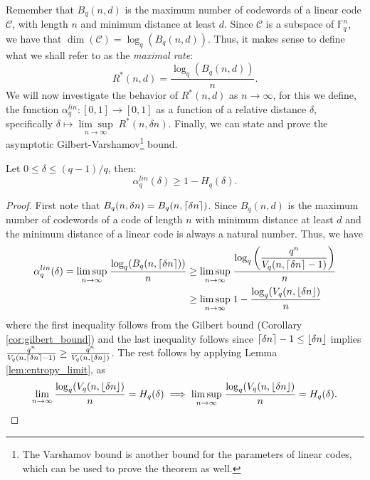 \newpage
Remember that $B_q(n, d)$ is the maximum number of codewords of a linear code $\mathcal{C}$, with length $n$ and minimum distance at least $d$. Since $\mathcal{C}$ is a subspace of $\mathbb{F}_q^{n}$, we have that $\dim(\mathcal{C}) = \log_q(B_q(n, d))$. Thus, it makes sense to define what we shall refer to as the \textit{maximal rate}:
\begin{equation*}
  R^{*}(n, d) = \frac{\log_{q}(B_{q}(n, d))}{n}.
\end{equation*}
We will now investigate the behavior of $R^{*}(n, d)$ as $n \to \infty$, for this we define, the function $\alpha_q^{lin}: [0, 1] \to [0, 1]$ as a function of a relative distance $\delta$, specifically $\delta \mapsto \underset{n \to \infty}{\lim \sup} \;R^{*}(n, \delta n)$. Finally, we can state and prove the asymptotic Gilbert-Varshamov\footnote{The Varshamov bound is another bound for the parameters of linear codes, which can be used to prove the theorem as well.} bound.
\begin{theorem}\label{thm:gilbert_varshamov}
  Let $0 \leq \delta \leq (q - 1)/q$, then:
  \begin{equation*}
  \alpha_q^{lin}(\delta) \geq 1 - H_q(\delta).
  \end{equation*}
\end{theorem}
\begin{proof}
  First note that $B_q(n, \delta n) = B_q(n, \lceil\delta n\rceil)$. Since $B_{q}(n, d)$ is the maximum number of codewords of a code of length $n$ with minimum distance at least $d$ and the minimum distance of a linear code is always a natural number.
  Thus, we have
  \begin{align*}
\alpha_q^{lin}(\delta) = \underset{n \to \infty}{\lim \sup} \; \frac{\log_q(B_q(n, \lceil\delta n\rceil))}{n} &\geq \underset{n \to \infty}{\lim \sup} \; \frac{\log_{q}\left(\dfrac{q^{n}}{V_{q}(n, \lceil\delta n\rceil - 1)}\right)}{n}\\ &\geq \underset{n \to \infty}{\lim \sup} \; 1 - \frac{\log_{q}({V_{q}(n, \lfloor\delta n\rfloor)}}{n}
  \end{align*}
  where the first inequality follows from the Gilbert bound (Corollary \ref{cor:gilbert_bound}) and the last inequality follows since $\lceil\delta n\rceil - 1 \leq \lfloor\delta n\rfloor$ implies $\frac{q^{n}}{V_{q}(n, \lceil\delta n\rceil - 1)} \geq \frac{q^{n}}{V_{q}(n, \lfloor\delta n\rfloor)}$. The rest follows by applying Lemma \ref{lem:entropy_limit}, as
  \begin{equation*}
  \lim_{n \to \infty}\frac{\log_{q}({V_{q}(n, \lfloor\delta n\rfloor)}}{n} = H_q(\delta) \implies \underset{n \to \infty}{\lim \sup} \;\frac{\log_{q}({V_{q}(n, \lfloor\delta n\rfloor)}}{n} = H_q(\delta). \qedhere
  \end{equation*}
\end{proof}
